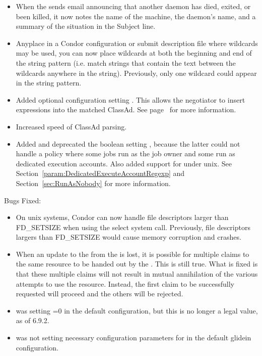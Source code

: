 \begin{itemize}
\item When the  sends email announcing that another daemon has
died, exited, or been killed, it now notes the name of the machine, the
daemon's name, and a summary of the situation in the Subject line.

\item Anyplace in a Condor configuration or submit description file where
wildcards may be used, you can now place wildcards at both the beginning
and end of the string pattern (i.e. match strings that contain the text
between the wildcards anywhere in the string). Previously, only one
wildcard could appear in the string pattern.

\item Added optional configuration setting
.  This allows the negotiator to
insert expressions into the matched ClassAd.  See
page~\pageref{param:NegotiatorMatchExprs} for more information.

\item Increased speed of ClassAd parsing.

\item Added  and
deprecated the boolean setting
, because the latter could not
handle a policy where some jobs run as the job owner and some run as
dedicated execution accounts.  Also added support for
 under unix.  See
Section~\ref{param:DedicatedExecuteAccountRegexp} and
Section~\ref{sec:RunAsNobody} for more information.

\end{itemize}

\noindent Bugs Fixed:

\begin{itemize}

\item On unix systems, Condor can now handle file descriptors larger than
FD\_SETSIZE when using the select system call. Previously, file descriptors
largers than FD\_SETSIZE would cause memory corruption and crashes.

\item When an update to the  from the
 is lost, it is possible for multiple claims to the
same resource to be handed out by the .  This is
still true.  What is fixed is that these multiple claims will not
result in mutual annihilation of the various attempts to use the
resource.  Instead, the first claim to be successfully requested will
proceed and the others will be rejected.

\item {} was setting =0 in the default
configuration, but this is no longer a legal value, as of 6.9.2.

\item {} was not setting necessary configuration parameters
for  in the default glidein configuration.

\end{itemize}

